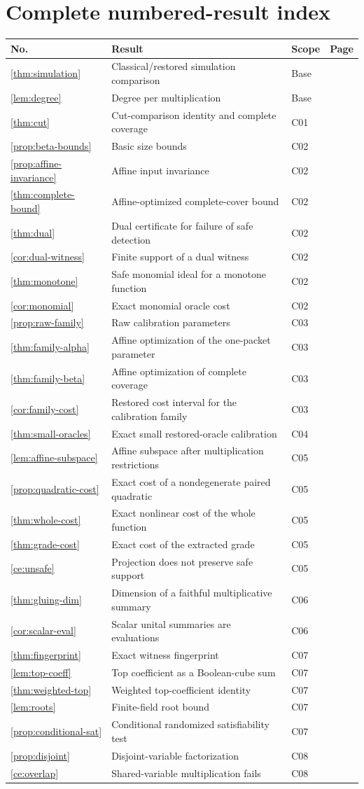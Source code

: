 \documentclass[11pt,letterpaper,oneside]{report}
\theoremstyle{komorebi}
\newcommand{\resultrow}[4]{\ref{#1} & #2 & #3 & \pageref{#1}\\}
\begin{document}
\section{Complete numbered-result index}
\small
\begin{longtable}{@{}p{0.40in}p{4.15in}p{0.74in}r@{}}
\toprule
\textbf{No.} & \textbf{Result} & \textbf{Scope} & \textbf{Page}\\\midrule\endhead
\resultrow{thm:simulation}{Classical/restored simulation comparison}{Base}{}
\resultrow{lem:degree}{Degree per multiplication}{Base}{}
\resultrow{thm:cut}{Cut-comparison identity and complete coverage}{C01}{}
\resultrow{prop:beta-bounds}{Basic size bounds}{C02}{}
\resultrow{prop:affine-invariance}{Affine input invariance}{C02}{}
\resultrow{thm:complete-bound}{Affine-optimized complete-cover bound}{C02}{}
\resultrow{thm:dual}{Dual certificate for failure of safe detection}{C02}{}
\resultrow{cor:dual-witness}{Finite support of a dual witness}{C02}{}
\resultrow{thm:monotone}{Safe monomial ideal for a monotone function}{C02}{}
\resultrow{cor:monomial}{Exact monomial oracle cost}{C02}{}
\resultrow{prop:raw-family}{Raw calibration parameters}{C03}{}
\resultrow{thm:family-alpha}{Affine optimization of the one-packet parameter}{C03}{}
\resultrow{thm:family-beta}{Affine optimization of complete coverage}{C03}{}
\resultrow{cor:family-cost}{Restored cost interval for the calibration family}{C03}{}
\resultrow{thm:small-oracles}{Exact small restored-oracle calibration}{C04}{}
\resultrow{lem:affine-subspace}{Affine subspace after multiplication restrictions}{C05}{}
\resultrow{prop:quadratic-cost}{Exact cost of a nondegenerate paired quadratic}{C05}{}
\resultrow{thm:whole-cost}{Exact nonlinear cost of the whole function}{C05}{}
\resultrow{thm:grade-cost}{Exact cost of the extracted grade}{C05}{}
\resultrow{ce:unsafe}{Projection does not preserve safe support}{C05}{}
\resultrow{thm:gluing-dim}{Dimension of a faithful multiplicative summary}{C06}{}
\resultrow{cor:scalar-eval}{Scalar unital summaries are evaluations}{C06}{}
\resultrow{thm:fingerprint}{Exact witness fingerprint}{C07}{}
\resultrow{lem:top-coeff}{Top coefficient as a Boolean-cube sum}{C07}{}
\resultrow{thm:weighted-top}{Weighted top-coefficient identity}{C07}{}
\resultrow{lem:roots}{Finite-field root bound}{C07}{}
\resultrow{prop:conditional-sat}{Conditional randomized satisfiability test}{C07}{}
\resultrow{prop:disjoint}{Disjoint-variable factorization}{C08}{}
\resultrow{ce:overlap}{Shared-variable multiplication fails}{C08}{}
\bottomrule
\end{longtable}
\normalsize
\end{document}
